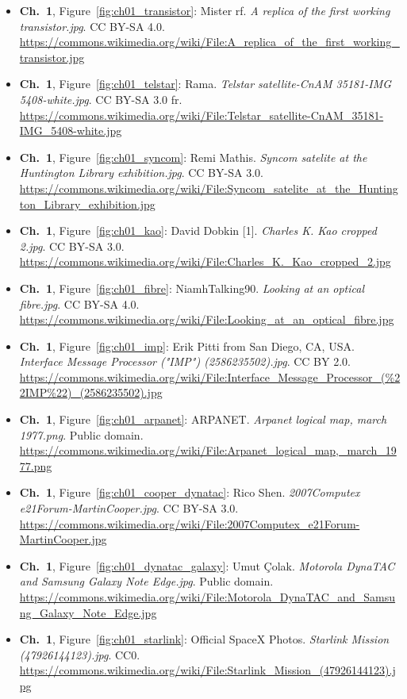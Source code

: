 \begin{small}
\begin{itemize}[leftmargin=0pt,itemsep=2pt,label={}]
\item \textbf{Ch.~1}, Figure~\ref{fig:ch01_transistor}: Mister rf. \emph{A replica of the first working transistor.\allowbreak{}jpg}. CC BY-SA 4.0. \url{https://commons.wikimedia.org/wiki/File:A_replica_of_the_first_working_transistor.jpg}
\item \textbf{Ch.~1}, Figure~\ref{fig:ch01_telstar}: Rama. \emph{Telstar satellite-\allowbreak{}CnAM 35181-\allowbreak{}IMG 5408-\allowbreak{}white.\allowbreak{}jpg}. CC BY-SA 3.0 fr. \url{https://commons.wikimedia.org/wiki/File:Telstar_satellite-CnAM_35181-IMG_5408-white.jpg}
\item \textbf{Ch.~1}, Figure~\ref{fig:ch01_syncom}: Remi Mathis. \emph{Syncom satelite at the Huntington Library exhibition.\allowbreak{}jpg}. CC BY-SA 3.0. \url{https://commons.wikimedia.org/wiki/File:Syncom_satelite_at_the_Huntington_Library_exhibition.jpg}
\item \textbf{Ch.~1}, Figure~\ref{fig:ch01_kao}: David Dobkin [1]. \emph{Charles K.\allowbreak{} Kao cropped 2.\allowbreak{}jpg}. CC BY-SA 3.0. \url{https://commons.wikimedia.org/wiki/File:Charles_K._Kao_cropped_2.jpg}
\item \textbf{Ch.~1}, Figure~\ref{fig:ch01_fibre}: NiamhTalking90. \emph{Looking at an optical fibre.\allowbreak{}jpg}. CC BY-SA 4.0. \url{https://commons.wikimedia.org/wiki/File:Looking_at_an_optical_fibre.jpg}
\item \textbf{Ch.~1}, Figure~\ref{fig:ch01_imp}: Erik Pitti from San Diego, CA, USA. \emph{Interface Message Processor ("IMP") (2586235502).\allowbreak{}jpg}. CC BY 2.0. \url{https://commons.wikimedia.org/wiki/File:Interface_Message_Processor_(%22IMP%22)_(2586235502).jpg}
\item \textbf{Ch.~1}, Figure~\ref{fig:ch01_arpanet}: ARPANET. \emph{Arpanet logical map, march 1977.\allowbreak{}png}. Public domain. \url{https://commons.wikimedia.org/wiki/File:Arpanet_logical_map,_march_1977.png}
\item \textbf{Ch.~1}, Figure~\ref{fig:ch01_cooper_dynatac}: Rico Shen. \emph{2007Computex e21Forum-\allowbreak{}MartinCooper.\allowbreak{}jpg}. CC BY-SA 3.0. \url{https://commons.wikimedia.org/wiki/File:2007Computex_e21Forum-MartinCooper.jpg}
\item \textbf{Ch.~1}, Figure~\ref{fig:ch01_dynatac_galaxy}: Umut Çolak. \emph{Motorola DynaTAC and Samsung Galaxy Note Edge.\allowbreak{}jpg}. Public domain. \url{https://commons.wikimedia.org/wiki/File:Motorola_DynaTAC_and_Samsung_Galaxy_Note_Edge.jpg}
\item \textbf{Ch.~1}, Figure~\ref{fig:ch01_starlink}: Official SpaceX Photos. \emph{Starlink Mission (47926144123).\allowbreak{}jpg}. CC0. \url{https://commons.wikimedia.org/wiki/File:Starlink_Mission_(47926144123).jpg}

\end{itemize}
\end{small}
